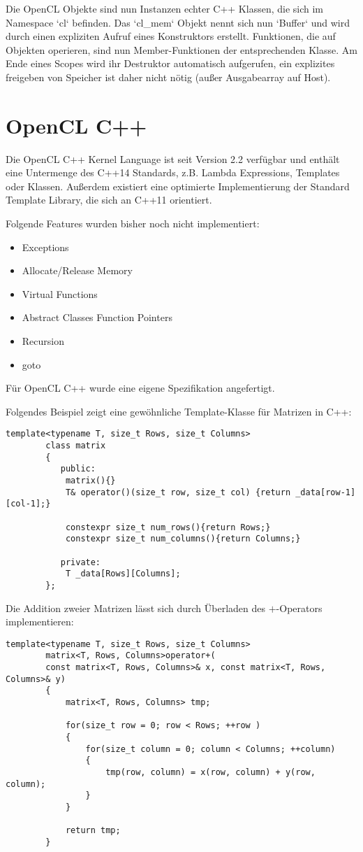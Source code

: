 		Die OpenCL Objekte sind nun Instanzen echter C++ Klassen, die sich im Namespace \li`cl` befinden. Das \li`cl_mem` Objekt nennt sich nun \li`Buffer` und wird durch einen expliziten Aufruf eines Konstruktors erstellt. Funktionen, die auf Objekten operieren, sind nun Member-Funktionen der entsprechenden Klasse. Am Ende eines Scopes wird ihr Destruktor automatisch aufgerufen, ein explizites freigeben von Speicher ist daher nicht nötig (außer Ausgabearray auf Host).
		
		
		\section{OpenCL C++}\label{OCLC++}
		Die OpenCL C++ \Gls{Kernel} Language ist seit Version 2.2 verfügbar und enthält eine Untermenge des C++14 Standards, z.B. Lambda Expressions, Templates oder Klassen. Außerdem existiert eine optimierte Implementierung der Standard Template Library, die sich an C++11 orientiert. 
		
		Folgende Features wurden bisher noch nicht implementiert:
		\begin{itemize}
			\item Exceptions
			\item Allocate/Release Memory
			\item Virtual Functions 
			\item Abstract Classes Function Pointers
			\item Recursion 
			\item goto
		\end{itemize}
		
		Für OpenCL C++ wurde eine eigene Spezifikation angefertigt. \autocite{oclC++Spec}
		
		Folgendes Beispiel zeigt eine gewöhnliche Template-Klasse für Matrizen in C++:
		\begin{lstlisting}[caption=~Matrix OpenCl C++]
		template<typename T, size_t Rows, size_t Columns>
		class matrix 
		{
		   public:
			matrix(){}
			T& operator()(size_t row, size_t col) {return _data[row-1][col-1];}

			constexpr size_t num_rows(){return Rows;}
			constexpr size_t num_columns(){return Columns;}
			
		   private:
			T _data[Rows][Columns];
		};
		\end{lstlisting}
		
		Die Addition zweier Matrizen lässt sich durch Überladen des $+$-Operators implementieren:
		\begin{lstlisting}[caption=~Matrixaddition OpenCl C++]
		template<typename T, size_t Rows, size_t Columns> 
		matrix<T, Rows, Columns>operator+(
		const matrix<T, Rows, Columns>& x, const matrix<T, Rows, Columns>& y) 
		{
			matrix<T, Rows, Columns> tmp;
			
			for(size_t row = 0; row < Rows; ++row ) 
			{
				for(size_t column = 0; column < Columns; ++column) 
				{
					tmp(row, column) = x(row, column) + y(row, column);
				}
			}
			
			return tmp;
		}
		\end{lstlisting}
		
